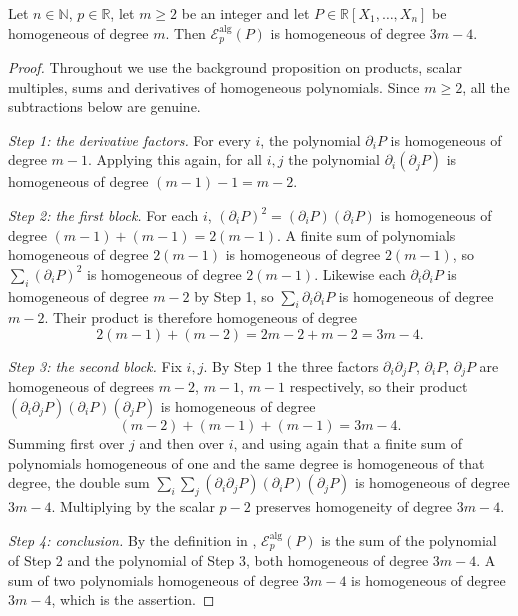 \begin{lemma}
Let $n\in\mathbb{N}$, $p\in\mathbb{R}$, let $m\ge2$ be an integer and let
$P\in\mathbb{R}[X_1,\dots,X_n]$ be homogeneous of degree $m$. Then
$\mathcal{E}^{\mathrm{alg}}_p(P)$ is homogeneous of degree $3m-4$.
\end{lemma}
\begin{proof}
Throughout we use the background proposition on products, scalar multiples, sums
and derivatives of homogeneous polynomials. Since $m\ge2$, all the subtractions
below are genuine.

\emph{Step 1: the derivative factors.} For every $i$, the polynomial
$\partial_iP$ is homogeneous of degree $m-1$. Applying this again, for all $i,j$
the polynomial $\partial_i(\partial_jP)$ is homogeneous of degree
$(m-1)-1=m-2$.

\emph{Step 2: the first block.} For each $i$,
$(\partial_iP)^2=(\partial_iP)(\partial_iP)$ is homogeneous of degree
$(m-1)+(m-1)=2(m-1)$. A finite sum of polynomials homogeneous of degree
$2(m-1)$ is homogeneous of degree $2(m-1)$, so
$\sum_i(\partial_iP)^2$ is homogeneous of degree $2(m-1)$. Likewise each
$\partial_i\partial_iP$ is homogeneous of degree $m-2$ by Step 1, so
$\sum_i\partial_i\partial_iP$ is homogeneous of degree $m-2$. Their product is
therefore homogeneous of degree
\[
  2(m-1)+(m-2)=2m-2+m-2=3m-4 .
\]

\emph{Step 3: the second block.} Fix $i,j$. By Step 1 the three factors
$\partial_i\partial_jP$, $\partial_iP$, $\partial_jP$ are homogeneous of degrees
$m-2$, $m-1$, $m-1$ respectively, so their product
$(\partial_i\partial_jP)(\partial_iP)(\partial_jP)$ is homogeneous of degree
\[
  (m-2)+(m-1)+(m-1)=3m-4 .
\]
Summing first over $j$ and then over $i$, and using again that a finite sum of
polynomials homogeneous of one and the same degree is homogeneous of that
degree, the double sum
$\sum_i\sum_j(\partial_i\partial_jP)(\partial_iP)(\partial_jP)$ is homogeneous of
degree $3m-4$. Multiplying by the scalar $p-2$ preserves homogeneity of degree
$3m-4$.

\emph{Step 4: conclusion.} By the definition in ,
$\mathcal{E}^{\mathrm{alg}}_p(P)$ is the sum of the polynomial of Step 2 and the
polynomial of Step 3, both homogeneous of degree $3m-4$. A sum of two
polynomials homogeneous of degree $3m-4$ is homogeneous of degree $3m-4$, which
is the assertion.
\end{proof}
